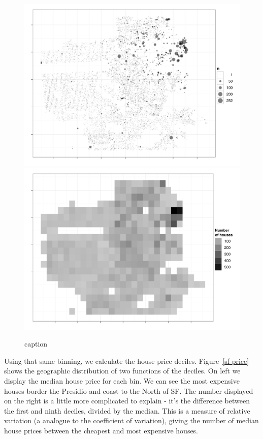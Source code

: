 \documentclass[oneside]{article}
\begin{document}
\begin{figure}[htbp]
  \centering
    \includegraphics[width=0.5\linewidth]{sf-geo-n}%
    \includegraphics[width=0.5\linewidth]{sf-bin-n}
  \caption{caption}
  \label{fig:sf-n}
\end{figure}

Using that same binning, we calculate the house price deciles.  Figure~\ref{sf-price} shows the geographic distribution of two functions of the deciles.  On left we display the median house price for each bin.  We can see the most expensive houses border the Presidio and coast to the North of SF.  The number displayed on the right is a little more complicated to explain - it's the difference between the first and ninth deciles, divided by the median.  This is a measure of relative variation (a analogue to the coefficient of variation), giving the number of median house prices between the cheapest and most expensive houses.
\end{document}
